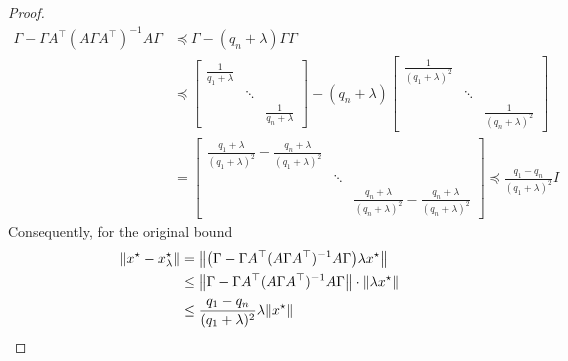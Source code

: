 \documentclass[12pt]{article}
\begin{document}
\begin{proof}
\begin{align*}
    \Gamma - \Gamma A^\top (A \Gamma A^\top)^{-1} A \Gamma
      &\preceq \Gamma - (q_n + \lambda) \Gamma \Gamma \\
      &\preceq
        \begin{bmatrix}
        \frac{1}{q_1 + \lambda} & & \\ & \ddots & \\ & & \frac{1}{q_n + \lambda}
        \end{bmatrix}
        - (q_n + \lambda)
          \begin{bmatrix}
            \frac{1}{(q_1 + \lambda)^2} & & \\ & \ddots & \\ & & \frac{1}{(q_n + \lambda)^2}
          \end{bmatrix} \\
      &= \begin{bmatrix}
            \frac{q_1 + \lambda}{(q_1 + \lambda)^2}
              - \frac{q_n + \lambda}{(q_1 + \lambda)^2} & & \\
            & \ddots & \\
            & & \frac{q_n + \lambda}{(q_n + \lambda)^2}
                - \frac{q_n + \lambda}{(q_n + \lambda)^2}
          \end{bmatrix}
        \preceq \frac{q_1 -  q_n}{(q_1 + \lambda)^2} I
  \end{align*}
  Consequently, for the original bound
  \begin{align*}
    {\left\lVert x^\star - x_\lambda ^\star\right\rVert}
      &= {\left\lVert{\left(\Gamma - \Gamma A^\top (A \Gamma A^\top)^{-1} A \Gamma\right)}
      \lambda x^\star\right\rVert} \\
    &\leq
      {\left\lVert\Gamma - \Gamma A^\top (A \Gamma A^\top)^{-1} A \Gamma\right\rVert}
        \cdot {\left\lVert\lambda x^\star\right\rVert} \\
    &\leq
      \frac{q_1 - q_n}{(q_1 + \lambda)^2}
        \lambda {\left\lVert x^\star\right\rVert}
  \end{align*}

\end{proof}


\printbibliography
\end{document}
